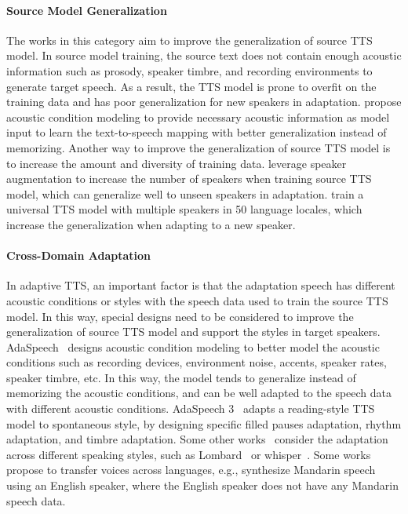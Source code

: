 \documentclass{article}
\begin{document}
\paragraph{Source Model Generalization} The works in this category aim to improve the generalization of source TTS model. In source model training, the source text does not contain enough acoustic information such as prosody, speaker timbre, and recording environments to generate target speech. As a result, the TTS model is prone to overfit on the training data and has poor generalization for new speakers in adaptation. \citet{chen2021adaspeech} propose acoustic condition modeling to provide necessary acoustic information as model input to learn the text-to-speech mapping with better generalization instead of memorizing. Another way to improve the generalization of source TTS model is to increase the amount and diversity of training data. \citet{cooper2020can} leverage speaker augmentation to increase the number of speakers when training source TTS model, which can generalize well to unseen speakers in adaptation. \citet{yang2020towards} train a universal TTS model with multiple speakers in 50 language locales, which increase the generalization when adapting to a new speaker.

\paragraph{Cross-Domain Adaptation} In adaptive TTS, an important factor is that the adaptation speech has different acoustic conditions or styles with the speech data used to train the source TTS model. In this way, special designs need to be considered to improve the generalization of source TTS model and support the styles in target speakers. AdaSpeech~\cite{chen2021adaspeech} designs acoustic condition modeling to better model the acoustic conditions such as recording devices, environment noise, accents, speaker rates, speaker timbre, etc. In this way, the model tends to generalize instead of memorizing the acoustic conditions, and can be well adapted to the speech data with different acoustic conditions. AdaSpeech 3~\cite{yan2021adaspeech3} adapts a reading-style TTS model to spontaneous style, by designing specific filled pauses adaptation, rhythm adaptation, and timbre adaptation. Some other works~\cite{paul2020enhancing,hu2021whispered} consider the adaptation across different speaking styles, such as Lombard~\cite{paul2020enhancing} or whisper~\cite{hu2021whispered}. Some works~\cite{zhang2019learning,chen2019cross,liu2019cross,zhao2020towards,himawan2020speaker,staib2020phonological,maiti2020generating,zhou2020end,hemati2020using} propose to transfer voices across languages, e.g., synthesize Mandarin speech using an English speaker, where the English speaker does not have any Mandarin speech data. 
\end{document}
